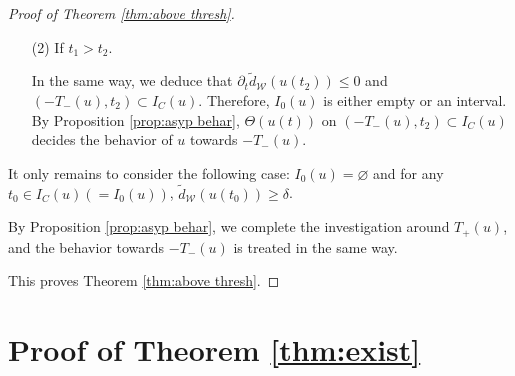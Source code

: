 \documentclass[reqno, 11pt]{amsart}
\numberwithin{equation}{section}
\theoremstyle{plain}
\theoremstyle{definition}
\numberwithin{equation}{section}
\numberwithin{theorem}{section}
\numberwithin{equation}{section}
\numberwithin{equation}{section}
\numberwithin{theorem}{section}
\begin{document}
\begin{proof}[Proof of Theorem \ref{thm:above thresh}]
\begin{enumerate}
			Since $\widetilde{d}_{\mathcal{W}}(u)\leq \epsilon/c_D<\delta$ on $I_0(u)$, we may assume $\widetilde{d}_{\mathcal{W}}\left(u(t_2)\right)<\delta$ by decreasing $t_2$ if necessary. Then the above argument works with $t_0:=t_2$, we can prove $\partial_{t}\widetilde{d}_{\mathcal{W}}\left(u(t_2)\right)\geq 0$. Indeed, if $\partial_{t}\widetilde{d}_{\mathcal{W}}\left(u(t_2)\right)<0$, then by (2) of case 1, we have $\left(-T_-(u),t_2 \right)\subset I_C(u)$, which implies $I_0(u)\subset[t_2, T_+(u))$. Since $t_1\in I_0(u)$, we have $t_1\geq t_2$, which leads to a contradiction. Therefore,  $\left[t_2,T_+(u)\right)\subset I_C(u)$, which implies $I_0(u)$ is either empty or an interval. Then by Proposition \ref{prop:asyp behar}, $\Theta(u(t))$ on $\left[t_2,T_+(u)\right)\subset I_C(u)$ decides the behavior of $u$ towards $T_+(u)$.
			\item[(2)] If $t_1 >t_2$.
			
			In the same way, we deduce that $\partial_{t}\widetilde{d}_{\mathcal{W}}\left(u(t_2)\right)\leq 0$ and $(-T_-(u),t_2)\subset I_C(u)$. Therefore, $I_0(u)$ is either empty or an interval. By Proposition \ref{prop:asyp behar}, $\Theta(u(t))$ on $(-T_-(u),t_2)\subset I_C(u)$ decides the behavior of $u$ towards $-T_-(u)$.
		\end{enumerate}	
		
		 It only remains to consider the following case: $I_0(u)=\varnothing$ and for any $t_0\in I_C(u)(=I_0(u))$, $\widetilde{d}_{\mathcal{W}}\left(u(t_0)\right)\geq\delta$.	
		
		By Proposition \ref{prop:asyp behar}, we complete the investigation around $T_+(u)$, and the behavior towards $-T_-(u)$ is treated in the same way. 
		
		This proves Theorem \ref{thm:above thresh}.  	
	\end{proof}
	
	
	
	\section{Proof of Theorem \ref{thm:exist}}\label{sect:pf exist}
	
\end{document}
